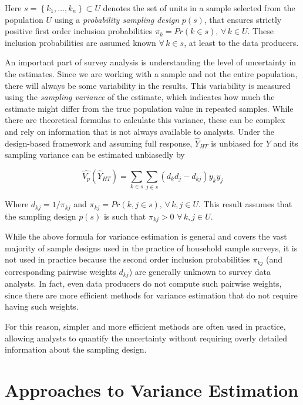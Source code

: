 \documentclass[
  12pt,
]{book}
\begin{document}
Here \(s = \left\{ k_1, \ldots, k_n \right\} \subset U\) denotes the set of units in a sample selected from the population \(U\) using a \emph{probability sampling design} \(p(s)\), that ensures strictly positive first order inclusion probabilities \(\pi_k = Pr(k \in s), \, \forall \, k \in U\). These inclusion probabilities are assumed known \(\forall \, k \in s\), at least to the data producers.

An important part of survey analysis is understanding the level of uncertainty in the estimates. Since we are working with a sample and not the entire population, there will always be some variability in the results. This variability is measured using the \emph{sampling variance} of the estimate, which indicates how much the estimate might differ from the true population value in repeated samples. While there are theoretical formulas to calculate this variance, these can be complex and rely on information that is not always available to analysts. Under the design-based framework and assuming full response, \(\widehat Y _{HT}\) is unbiased for \(Y\) and its sampling variance can be estimated unbiasedly by

\[
\widehat {V_p} \left( \widehat{Y}_{HT} \right) = \sum_{k \in s} \sum_{j \in s} \left( d_k d_j - d_{kj} \right) y_k y_j
\]

Where \(d_{kj} = 1 / \pi_{kj}\) and \(\pi_{kj} = Pr(k,j \in s), \, \forall \, k,j \in U\). This result assumes that the sampling design \(p(s)\) is such that \(\pi_{kj} > 0 \,\, \forall \, k,j \in U\).

While the above formula for variance estimation is general and covers the vast majority of sample designs used in the practice of household sample surveys, it is not used in practice because the second order inclusion probabilities \(\pi_{kj}\) (and corresponding pairwise weights \(d_{kj}\)) are generally unknown to survey data analysts. In fact, even data producers do not compute such pairwise weights, since there are more efficient methods for variance estimation that do not require having such weights.

For this reason, simpler and more efficient methods are often used in practice, allowing analysts to quantify the uncertainty without requiring overly detailed information about the sampling design.

\hypertarget{approaches-to-variance-estimation}{%
\section{Approaches to Variance Estimation}\label{approaches-to-variance-estimation}}
\end{document}

